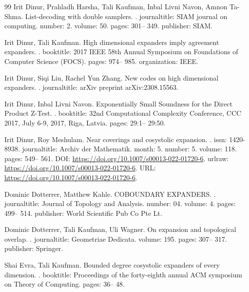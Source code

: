 \begin{thebibliography}{99}
Irit Dinur, Prahladh Harsha, Tali Kaufman, Inbal Livni Navon, Amnon Ta-Shma.
\newblock List-decoding with double samplers.
.
\newblock journaltitle: SIAM journal on computing.
\newblock number: 2.
\newblock volume: 50.
\newblock pages: 301-- 349.
\newblock publisher: SIAM.

Irit Dinur, Tali Kaufman.
\newblock High dimensional expanders imply agreement expanders.
.
\newblock booktitle: 2017 IEEE 58th Annual Symposium on Foundations of Computer Science (FOCS).
\newblock pages: 974-- 985.
\newblock organization: IEEE.

Irit Dinur, Siqi Liu, Rachel Yun Zhang.
\newblock New codes on high dimensional expanders.
.
\newblock journaltitle: arXiv preprint arXiv:2308.15563.

Irit Dinur, Inbal {Livni Navon}.
\newblock Exponentially Small Soundness for the Direct Product Z-Test.
.
\newblock booktitle: 32nd Computational Complexity Conference, {CCC} 2017, July 6-9, 2017, Riga, Latvia.
\newblock pages: 29:1-- 29:50.

Irit Dinur, Roy Meshulam.
\newblock Near coverings and cosystolic expansion.
.
\newblock issn: 1420-8938.
\newblock journaltitle: Archiv der Mathematik.
\newblock month: 5.
\newblock number: 5.
\newblock volume: 118.
\newblock pages: 549-- 561.
\newblock DOI: \url{https://doi.org/10.1007/s00013-022-01720-6}.
\newblock urlraw: \url{https://doi.org/10.1007/s00013-022-01720-6}.
\newblock URL: \url{https://doi.org/10.1007/s00013-022-01720-6}.

Dominic Dotterrer, Matthew Kahle.
\newblock COBOUNDARY EXPANDERS.
.
\newblock journaltitle: Journal of Topology and Analysis.
\newblock number: 04.
\newblock volume: 4.
\newblock pages: 499-- 514.
\newblock publisher: World Scientific Pub Co Pte Lt.

Dominic Dotterrer, Tali Kaufman, Uli Wagner.
\newblock On expansion and topological overlap.
.
\newblock journaltitle: Geometriae Dedicata.
\newblock volume: 195.
\newblock pages: 307-- 317.
\newblock publisher: Springer.

Shai Evra, Tali Kaufman.
\newblock Bounded degree cosystolic expanders of every dimension.
.
\newblock booktitle: Proceedings of the forty-eighth annual ACM symposium on Theory of Computing.
\newblock pages: 36-- 48.


\end{thebibliography}
